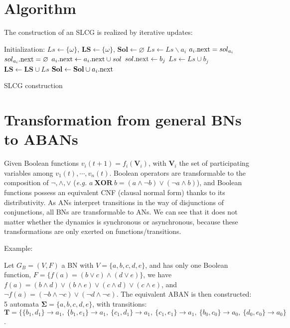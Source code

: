 \documentclass[runningheads]{llncs}
\newcommand{\acm}[3]{\{#1\}\rightarrow#3}
\begin{document}
\appendix
\section{Algorithm}\label{appendix:B}
The construction of an SLCG is realized by iterative updates:
\begin{algorithm}[ht]
\begin{algorithmic}
\State Initialization: 
$Ls\gets \{\omega\}$, $\mathbf{LS}\gets\{\omega\}$, $\mathbf{Sol}\gets \varnothing$
		\State $Ls\gets Ls\backslash a_i$
			\State $a_i{\rm .next}=sol_{a_i}$
            \State $sol_{a_i}{\rm .next}=\varnothing$
    	\Else
    		\For{$sol=\acm{A}{a_{1- i}}{a_i}\in \mathbf{T}$}
    			\State $a_i{\rm .next}\gets a_i{\rm .next}\cup sol$
    				\State $sol{\rm .next}\gets b_j$
    			\EndFor
    			\State $Ls\gets Ls\cup b_j$
                \State $\mathbf{LS}\gets \mathbf{LS}\cup Ls$
    		\EndFor
    		\State$\mathbf{Sol}\gets \mathbf{Sol}\cup a_i{\rm .next}$           
    	\EndIf
	\EndFor
\EndWhile
\State{}
\end{algorithmic}
\caption{SLCG construction}
\label{algorithm:2}
\end{algorithm}
\section{Transformation from general BNs to ABANs}\label{appendix:C}

Given Boolean functions $v_i(t+1)=f_i(\mathbf{V}_i)$, with $\mathbf{V}_i$ the set of participating variables among $v_1(t),\cdots,v_n(t)$.
Boolean operators are transformable to the composition of $\lnot,\land,\lor$ (\textit{e.g.} $a\ \mathbf{XOR} \ b = (a\land \lnot b)\lor (\lnot a\land b)$), and Boolean functions possess an equivalent CNF (clausal normal form) thanks to its distributivity.
As ANs interpret transitions in the way of disjunctions of conjunctions, all BNs are transformable to ANs. 
We can see that it does not matter whether the dynamics is synchronous or asynchronous, because these transformations are only exerted on functions/transitions.

Example: 

Let $G_B=(V,F)$ a BN with $V=\{a,b,c,d,e\}$, and has only one Boolean function, $F=\{f(a)= (b\lor c)\land(d\lor e)\}$, we have 
$f(a)=(b\land d)\lor(b\land e)\lor(c\land d)\lor(c\land e)$, and $\lnot f(a)=(\lnot b\land \lnot c)\lor(\lnot d\land \lnot e)$. 
The equivalent ABAN is then constructed: 5 automata $\mathbf{\Sigma}=\{a,b,c,d,e\}$, with transitions: $\mathbf{T}=\{\acm{b_1,d_1}{a_0}{a_1},\ \acm{b_1,e_1}{a_0}{a_1},\ \acm{c_1,d_1}{a_0}{a_1},\ \acm{c_1,e_1}{a_0}{a_1},\ \acm{b_0,c_0}{a_1}{a_0},\ \acm{d_0,e_0}{a_1}{a_0}\}$.
\end{document}
